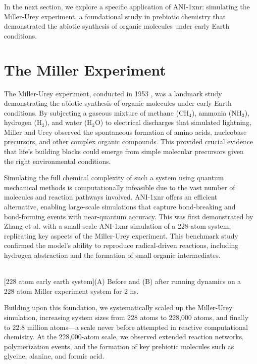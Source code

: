 In the next section, we explore a specific application of ANI-1xnr: simulating the Miller-Urey experiment, a foundational study in prebiotic chemistry that demonstrated the abiotic synthesis of organic molecules under early Earth conditions. 

\section{The Miller Experiment}
\label{sec:miller_experiment}

The Miller-Urey experiment, conducted in 1953 \cite{miller_experiment}, was a landmark study demonstrating the abiotic synthesis of organic molecules under early Earth conditions. By subjecting a gaseous mixture of methane ($\text{CH}_4$), ammonia ($\text{NH}_3$), hydrogen ($\text{H}_2$), and water ($\text{H}_2\text{O}$) to electrical discharges that simulated lightning, Miller and Urey observed the spontaneous formation of amino acids, nucleobase precursors, and other complex organic compounds. This provided crucial evidence that life's building blocks could emerge from simple molecular precursors given the right environmental conditions.

Simulating the full chemical complexity of such a system using quantum mechanical methods is computationally infeasible due to the vast number of molecules and reaction pathways involved. ANI-1xnr offers an efficient alternative, enabling large-scale simulations that capture bond-breaking and bond-forming events with near-quantum accuracy. This was first demonstrated by Zhang et al. \cite{ani-1xnr} with a small-scale ANI-1xnr simulation of a 228-atom system, replicating key aspects of the Miller-Urey experiment. This benchmark study confirmed the model’s ability to reproduce radical-driven reactions, including hydrogen abstraction and the formation of small organic intermediates.

\begin{flushleft}
\begin{multiFigure}
     \\
[228 atom early earth system]{(A) Before and (B) after running dynamics on a 228 atom Miller experiment system for 2 ns.
}
\label{fig:228_atom_run}
\end{multiFigure}
\end{flushleft}

Building upon this foundation, we systematically scaled up the Miller-Urey simulation, increasing system sizes from 228 atoms to 228,000 atoms, and finally to 22.8 million atoms---a scale never before attempted in reactive computational chemistry. At the 228,000-atom scale, we observed extended reaction networks, polymerization events, and the formation of key prebiotic molecules such as glycine, alanine, and formic acid. 

